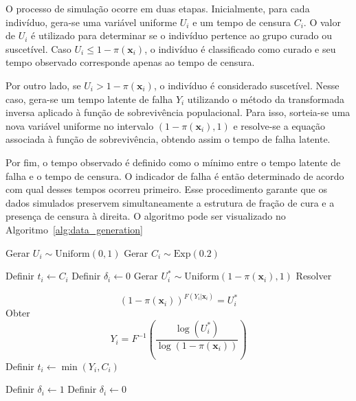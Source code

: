 O processo de simulação ocorre em duas etapas. Inicialmente, para cada indivíduo, gera-se uma variável
uniforme $U_i$ e um tempo de censura $C_i$. O valor de $U_i$ é utilizado para determinar se o indivíduo
pertence ao grupo curado ou suscetível. Caso $U_i \leq 1-\pi(\mathbf{x}_i)$, o indivíduo é classificado como
curado e seu tempo observado corresponde apenas ao tempo de censura.

Por outro lado, se $U_i > 1-\pi(\mathbf{x}_i)$, o indivíduo é considerado suscetível. Nesse caso, gera-se um
tempo latente de falha $Y_i$ utilizando o método da transformada inversa aplicado à função de sobrevivência
populacional. Para isso, sorteia-se uma nova variável uniforme no intervalo $(1-\pi(\mathbf{x}_i),1)$ e
resolve-se a equação associada à função de sobrevivência, obtendo assim o tempo de falha latente.

Por fim, o tempo observado é definido como o mínimo entre o tempo latente de falha e o tempo de censura. O
indicador de falha é então determinado de acordo com qual desses tempos ocorreu primeiro. Esse procedimento garante
que os dados simulados preservem simultaneamente a estrutura de fração de cura e a presença de censura à direita.
O algoritmo pode ser visualizado no Algoritmo~\ref{alg:data_generation}

\begin{algorithm}[H]
\caption{Geração de dados simulados com fração de cura}
\label{alg:data_generation}
\begin{algorithmic}[1]
    \State Gerar $U_i \sim \text{Uniform}(0,1)$
    \State Gerar $C_i \sim \text{Exp}(0.2)$

        \State Definir $t_i \leftarrow C_i$
        \State Definir $\delta_i \leftarrow 0$
    \Else
        \State Gerar $U_i^* \sim \text{Uniform}(1-\pi(\mathbf{x}_i),1)$
        \State Resolver

        \[
        (1-\pi(\mathbf{x}_i))^{F(Y_i|\mathbf{x}_i)}=U_i^*
        \]
        \State Obter
        \[
        Y_i=
        F^{-1}
        \left(
        \frac{\log(U_i^*)}
        {\log(1-\pi(\mathbf{x}_i))}
        \right)
        \]
        \State Definir $t_i \leftarrow \min(Y_i,C_i)$

            \State Definir $\delta_i \leftarrow 1$
        \Else
            \State Definir $\delta_i \leftarrow 0$
        \EndIf
    \EndIf
\EndFor
\end{algorithmic}
\end{algorithm}

